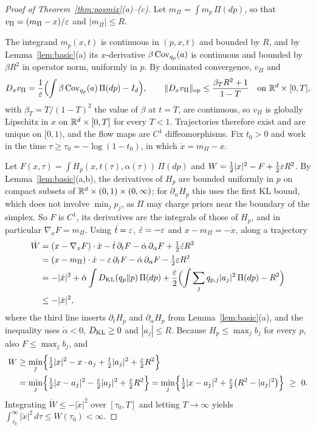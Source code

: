 \documentclass{article} %
\theoremstyle{plain}
\theoremstyle{definition}
\theoremstyle{remark}
\begin{document}
\begin{proof}[Proof of Theorem~\ref{thm:posmix}(a)--(c)]
Let $m_\Pi=\int m_p\,\Pi(dp)$, so that $v_\Pi=(m_\Pi-x)/\varepsilon$ and $|m_\Pi|\le R$.

The integrand $m_p(x,t)$ is continuous in $(p,x,t)$ and bounded by $R$, and by
Lemma~\ref{lem:basic}(a) its $x$-derivative $\beta\operatorname{Cov}_{q_p}(a)$ is continuous and bounded by
$\beta R^2$ in operator norm, uniformly in $p$. By dominated convergence, $v_\Pi$ and
\[
D_xv_\Pi=\frac{1}{\varepsilon}\Bigl(\int\beta\operatorname{Cov}_{q_p}(a)\,\Pi(dp)-I_d\Bigr),\qquad
\|D_xv_\Pi\|_{\rm op}\le\frac{\beta_TR^2+1}{1-T}\quad\text{on }\mathbb{R}^d\times[0,T],
\]
with $\beta_T=T/(1-T)^2$ the value of $\beta$ at $t=T$, are continuous, so $v_\Pi$ is globally Lipschitz in $x$ on $\mathbb{R}^d\times[0,T]$ for every $T<1$.
Trajectories therefore exist and are unique on $[0,1)$, and the flow maps are $C^1$
diffeomorphisms. Fix $t_0>0$ and work in the time $\tau\ge\tau_0=-\log(1-t_0)$, in which
$\dot x=m_\Pi-x$.

Let $F(x,\tau)=\int H_p(x,t(\tau),\alpha(\tau))\,\Pi(dp)$ and $W=\tfrac12|x|^2-F+\tfrac12\varepsilon R^2$.
By Lemma~\ref{lem:basic}(a,b), the derivatives of $H_p$ are bounded uniformly in $p$ on compact
subsets of $\mathbb{R}^d\times(0,1)\times(0,\infty)$; for $\partial_\alpha H_p$ this uses the first KL
bound, which does not involve $\min_jp_j$, as $\Pi$ may charge priors near the boundary of the
simplex. So $F$ is $C^1$, its derivatives are the integrals of those of $H_p$, and in particular
$\nabla_xF=m_\Pi$. Using $\dot t=\varepsilon$, $\dot{\varepsilon}=-\varepsilon$ and $x-m_\Pi=-\dot x$, along a trajectory
\begin{align*}
\dot W
&=(x-\nabla_xF)\cdot\dot x-\dot t\,\partial_tF-\dot\alpha\,\partial_\alpha F+\tfrac12\dot{\varepsilon} R^2\\
&=(x-m_\Pi)\cdot\dot x-\varepsilon\,\partial_tF-\dot\alpha\,\partial_\alpha F-\tfrac12\varepsilon R^2\\
&=-|\dot x|^2+\dot\alpha\int D_{\rm KL}(q_p\Vert p)\,\Pi(dp)
+\frac{\varepsilon}2\Bigl(\int\sum_jq_{p,j}|a_j|^2\,\Pi(dp)-R^2\Bigr)\\
&\le-|\dot x|^2 ,
\end{align*}
where the third line inserts $\partial_tH_p$ and $\partial_\alpha H_p$ from
Lemma~\ref{lem:basic}(a), and the inequality uses $\dot\alpha<0$, $D_{\rm KL}\ge0$ and
$|a_j|\le R$. Because $H_p\le\max_jb_j$ for every $p$, also $F\le\max_jb_j$, and
\begin{align*}
W&\ge\min_j\Bigl\{\tfrac12|x|^2-x\cdot a_j+\tfrac t2|a_j|^2+\tfrac\eps2R^2\Bigr\}\\
&=\min_j\Bigl\{\tfrac12|x-a_j|^2-\tfrac{\eps}2|a_j|^2+\tfrac\eps2R^2\Bigr\}
=\min_j\Bigl\{\tfrac12|x-a_j|^2+\tfrac\eps2\bigl(R^2-|a_j|^2\bigr)\Bigr\}\ \ge\ 0 .
\end{align*}
Integrating $\dot W\le-|\dot x|^2$ over $[\tau_0,T]$ and letting $T\to\infty$ yields
$\int_{\tau_0}^\infty|\dot x|^2\,d\tau\le W(\tau_0)<\infty$.


\end{proof}
\end{document}
